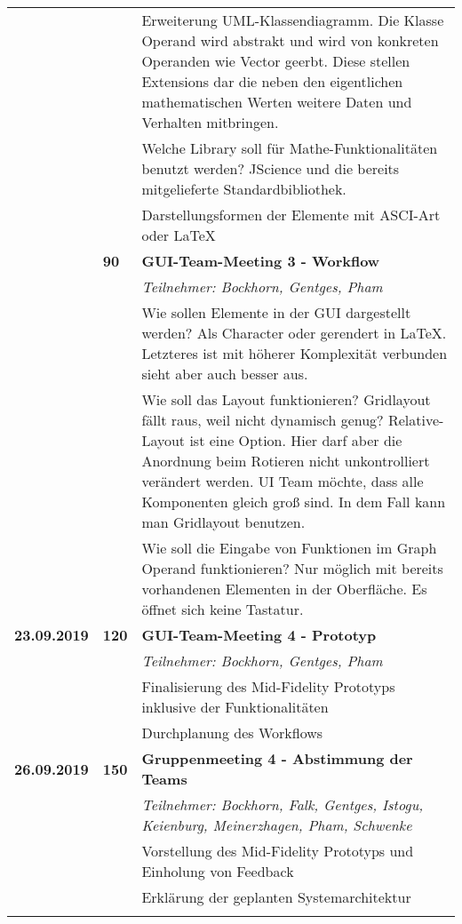 {{\begin{longtable}{|l|l|p{11cm}|}
			\\ & &
			Erweiterung UML-Klassendiagramm. Die Klasse Operand wird abstrakt und wird von konkreten Operanden wie Vector geerbt. Diese stellen Extensions dar die neben den eigentlichen mathematischen Werten weitere Daten und Verhalten mitbringen.
			\\ & &
			Welche Library soll für Mathe-Funktionalitäten benutzt werden? JScience und die bereits mitgelieferte Standardbibliothek.
			\\ & &
			Darstellungsformen der Elemente mit ASCI-Art oder LaTeX
		\\ \cline{2-3}
		& \textbf{\hfill90} & \textbf{GUI-Team-Meeting 3 - Workflow} 
			\\ & &
			\small{\textit{Teilnehmer: Bockhorn, Gentges, Pham}}
			\\ & &
			Wie sollen Elemente in der GUI dargestellt werden? Als Character oder gerendert in LaTeX. Letzteres ist mit höherer Komplexität verbunden sieht aber auch besser aus. 
			\\ & &
			Wie soll das Layout funktionieren? Gridlayout fällt raus, weil nicht dynamisch genug? Relative-Layout ist eine Option. Hier darf aber die Anordnung beim Rotieren nicht unkontrolliert verändert werden. UI Team möchte, dass alle Komponenten gleich groß sind. In dem Fall kann man Gridlayout benutzen.
			\\ & &
			Wie soll die Eingabe von Funktionen im Graph Operand funktionieren? Nur möglich mit bereits vorhandenen Elementen in der Oberfläche. Es öffnet sich keine Tastatur.
	\\\hline
		\textbf{23.09.2019} 
			& \textbf{\hfill120} & \textbf{GUI-Team-Meeting 4 - Prototyp} 
			\\ & &
			\small{\textit{Teilnehmer: Bockhorn, Gentges, Pham}}
			\\ & &
			Finalisierung des Mid-Fidelity Prototyps inklusive der Funktionalitäten
			\\ & &
			Durchplanung des Workflows			
	\\\hline
		\textbf{26.09.2019} 
			& \textbf{\hfill150} & \textbf{Gruppenmeeting 4 - Abstimmung der Teams}
			\\ & &
			\small{\textit{Teilnehmer: Bockhorn, Falk, Gentges, Istogu, Keienburg, Meinerzhagen, Pham, Schwenke}}
			\\ & &
			Vorstellung des Mid-Fidelity Prototyps und Einholung von Feedback
			\\ & &
			Erklärung der geplanten Systemarchitektur
			\\ & &

\end{longtable}}}
